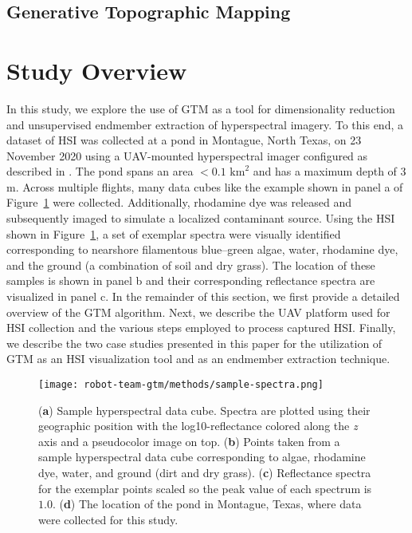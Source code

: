 \subsection{Generative Topographic Mapping}


\section{Study Overview}


In this study, we explore the use of  GTM as a tool for dimensionality reduction
and unsupervised endmember extraction of hyperspectral imagery. To this end, a
dataset of HSI was collected at a pond in Montague, North Texas, on 23 November
2020 using a UAV-mounted hyperspectral imager configured as described in
\cite{robot-team-1, robot-team-2}. The pond spans an area $<0.1$ $\text{km}^2$
and has a maximum depth of $3$ m. Across multiple flights, many data cubes like
the example shown in panel a of Figure~\ref{fig:sample-spectra} were collected.
Additionally, rhodamine dye was released and subsequently imaged to simulate a
localized contaminant source. Using the HSI shown in
Figure~\ref{fig:sample-spectra}, a set of exemplar spectra were visually
identified corresponding to nearshore filamentous blue--green algae, water,
rhodamine dye, and the ground (a combination of soil and dry grass). The
location of these samples is shown in panel b and their corresponding
reflectance spectra are visualized in panel c.  In the remainder of this
section, we first provide a detailed overview of the GTM algorithm. Next, we
describe the UAV platform used for HSI collection and the various steps employed
to process captured HSI. Finally, we describe the two case studies presented in
this paper for the utilization of  GTM as an HSI visualization tool and as an
endmember extraction technique.



\begin{figure}[H]
  \centering
  \texttt{[image: robot-team-gtm/methods/sample-spectra.png]}
  \caption{(\textbf{a}) Sample hyperspectral data cube. Spectra are plotted
    using their geographic position with the log10-reflectance colored along the
    \emph{z} axis and a pseudocolor image on top. (\textbf{b}) Points taken from
    a sample hyperspectral data cube corresponding to algae, rhodamine dye,
    water, and ground (dirt and dry grass). (\textbf{c}) Reflectance spectra for
    the exemplar points scaled so the peak value of each spectrum is $1.0$.
    (\textbf{d}) The location of the pond in Montague, Texas, where data were
    collected for this study.}
    \label{fig:sample-spectra}
\end{figure}

